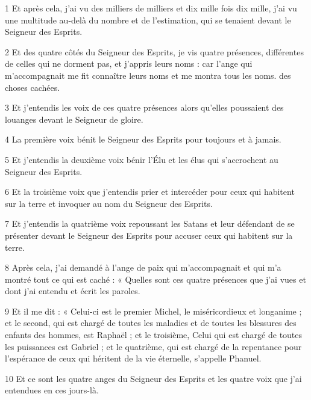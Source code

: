 
\par 1 Et après cela, j'ai vu des milliers de milliers et dix mille fois dix mille, j'ai vu une multitude au-delà du nombre et de l'estimation, qui se tenaient devant le Seigneur des Esprits.
\par 2 Et des quatre côtés du Seigneur des Esprits, je vis quatre présences, différentes de celles qui ne dorment pas, et j'appris leurs noms : car l'ange qui m'accompagnait me fit connaître leurs noms et me montra tous les noms. des choses cachées.
\par 3 Et j'entendis les voix de ces quatre présences alors qu'elles poussaient des louanges devant le Seigneur de gloire.
\par 4 La première voix bénit le Seigneur des Esprits pour toujours et à jamais.
\par 5 Et j'entendis la deuxième voix bénir l'Élu et les élus qui s'accrochent au Seigneur des Esprits.
\par 6 Et la troisième voix que j'entendis prier et intercéder pour ceux qui habitent sur la terre et invoquer au nom du Seigneur des Esprits.
\par 7 Et j'entendis la quatrième voix repoussant les Satans et leur défendant de se présenter devant le Seigneur des Esprits pour accuser ceux qui habitent sur la terre.
\par 8 Après cela, j'ai demandé à l'ange de paix qui m'accompagnait et qui m'a montré tout ce qui est caché : « Quelles sont ces quatre présences que j'ai vues et dont j'ai entendu et écrit les paroles.
\par 9 Et il me dit : « Celui-ci est le premier Michel, le miséricordieux et longanime ; et le second, qui est chargé de toutes les maladies et de toutes les blessures des enfants des hommes, est Raphaël ; et le troisième, Celui qui est chargé de toutes les puissances est Gabriel ; et le quatrième, qui est chargé de la repentance pour l'espérance de ceux qui héritent de la vie éternelle, s'appelle Phanuel.
\par 10 Et ce sont les quatre anges du Seigneur des Esprits et les quatre voix que j'ai entendues en ces jours-là.



